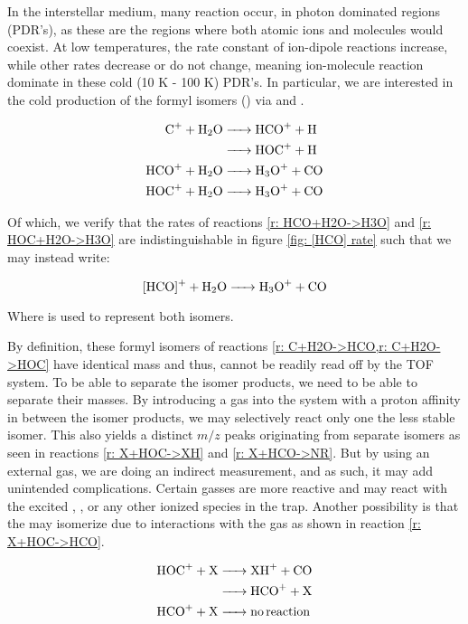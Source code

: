 In the interstellar medium, many reaction occur, in photon dominated regions (PDR's), as these are the regions where both atomic ions and molecules would coexist. At low temperatures, the rate constant of ion-dipole reactions increase, while other rates decrease or do not change, meaning ion-molecule reaction dominate in these cold (10 K - 100 K) PDR's. In particular, we are interested in the cold production of the formyl isomers () via  and .

\begin{align}
	\ce{C+ + H2O & -> HCO+ + H} \label{r: C+H2O->HCO} \\
	\ce{& -> HOC+ + H} \label{r: C+H2O->HOC} \\
	\ce{HCO+ + H2O & -> H3O+ + CO} \label{r: HCO+H2O->H3O} \\
	\ce{HOC+ + H2O & -> H3O+ + CO} \label{r: HOC+H2O->H3O}
\end{align}

Of which, we verify that the rates of reactions \ref{r: HCO+H2O->H3O} and \ref{r: HOC+H2O->H3O} are indistinguishable in figure \ref{fig: [HCO] rate} such that we may instead write:

\begin{equation}
	\ce{[HCO]+ + H2O -> H3O+ + CO} \label{r: [HCO]+H2O->H3O}
\end{equation}

Where \ce{[HCO]+} is used to represent both isomers. 

By definition, these formyl isomers of reactions \cref{r: C+H2O->HCO,r: C+H2O->HOC} have identical mass and thus, cannot be readily read off by the TOF system. To be able to separate the isomer products, we need to be able to separate their masses. By introducing a gas into the system with a proton affinity in between the isomer products, we may selectively react only one the less stable  isomer. This also yields a distinct $m/z$ peaks originating from separate isomers as seen in reactions \ref{r: X+HOC->XH} and \ref{r: X+HCO->NR}. But by using an external gas, we are doing an indirect measurement, and as such, it may add unintended complications. Certain gasses are more reactive and may react with the excited , , or any other ionized species in the trap. Another possibility is that the  may isomerize due to interactions with the gas as shown in reaction \ref{r: X+HOC->HCO}.\cite{Love1987}

\begin{align}
	\ce{HOC+ + X & -> XH+ + CO} \label{r: X+HOC->XH} \\
	\ce{& -> HCO+ + X} \label{r: X+HOC->HCO} \\
	\ce{HCO+ + X & -> no reaction} \label{r: X+HCO->NR}
\end{align}

